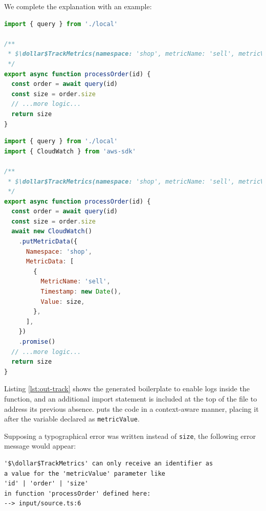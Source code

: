 We complete the explanation with an example:
\begin{lstlisting}[language=javascript, caption={Input code for \annotation{$\dollar$TrackMetrics}}]
import { query } from './local'

/**
 * $\dollar$TrackMetrics(namespace: 'shop', metricName: 'sell', metricValue: size)
 */
export async function processOrder(id) {
  const order = await query(id)
  const size = order.size
  // ...more logic...
  return size
}
\end{lstlisting}


\begin{lstlisting}[language=javascript, caption={Output code from \annotation{$\dollar$TrackMetrics}}, label={lst:out-track}]
import { query } from './local'
import { CloudWatch } from 'aws-sdk'

/**
 * $\dollar$TrackMetrics(namespace: 'shop', metricName: 'sell', metricValue: size)
 */
export async function processOrder(id) {
  const order = await query(id)
  const size = order.size
  await new CloudWatch()
    .putMetricData({
      Namespace: 'shop',
      MetricData: [
        {
          MetricName: 'sell',
          Timestamp: new Date(),
          Value: size,
        },
      ],
    })
    .promise()
  // ...more logic...
  return size
}
\end{lstlisting}

Listing \ref{lst:out-track} shows the generated boilerplate to enable logs inside the function,
and an additional import statement is included at the top of the file to address its previous absence.
 puts the code in a context-aware manner,
placing it after the variable declared as \verb|metricValue|.

Supposing a typographical error was written instead of \verb|size|, the following error message would appear:
\begin{lstlisting}[language=console]
'$\dollar$TrackMetrics' can only receive an identifier as
a value for the 'metricValue' parameter like
'id' | 'order' | 'size'
in function 'processOrder' defined here:
--> input/source.ts:6
\end{lstlisting}

